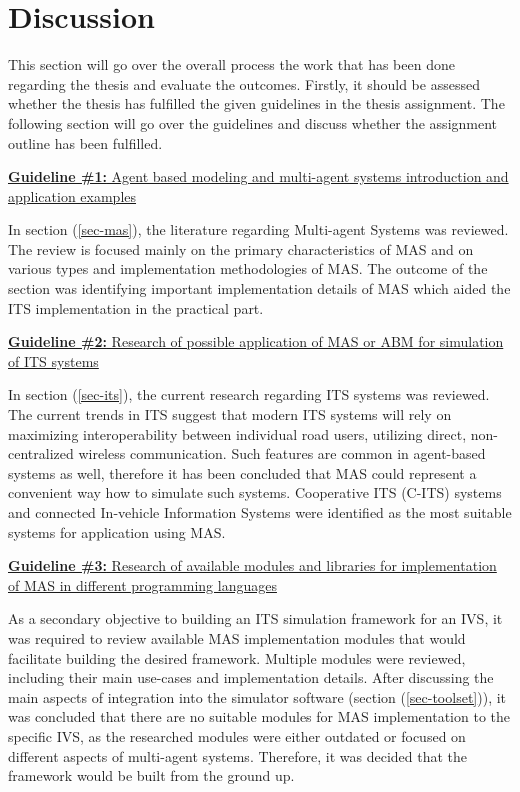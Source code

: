 \documentclass[main.tex]{subfiles}
\begin{document}
\section{Discussion}

This section will go over the overall process the work that has been done regarding the thesis and evaluate the outcomes.
Firstly, it should be assessed whether the thesis has fulfilled the given guidelines in the thesis assignment. The following 
section will go over the guidelines and discuss whether the assignment outline has been fulfilled. 

\ul{\textbf{Guideline \#1:} Agent based modeling and multi-agent systems introduction and application examples}

In section (\ref{sec-mas}), the literature regarding Multi-agent Systems was reviewed. The review is focused mainly on the 
primary characteristics of MAS and on various types and implementation methodologies of MAS. The outcome of the section 
was identifying important implementation details of MAS which aided the ITS implementation in the practical part. 

\ul{\textbf{Guideline \#2:} Research of possible application of MAS or ABM for simulation of ITS systems}

In section (\ref{sec-its}), the current research regarding ITS systems was reviewed. The current trends in ITS suggest that 
modern ITS systems will rely on maximizing interoperability between individual road users, utilizing direct, non-centralized wireless 
communication. Such features are common in agent-based systems as well, therefore it has been concluded that MAS could represent 
a convenient way how to simulate such systems. Cooperative ITS (C-ITS) systems and connected In-vehicle Information Systems were 
identified as the most suitable systems for application using MAS.

\ul{\textbf{Guideline \#3:} Research of available modules and libraries for implementation of MAS in different programming
languages}

As a secondary objective to building an ITS simulation framework for an IVS, it was required to review available MAS implementation 
modules that would facilitate building the desired framework. Multiple modules were reviewed, including their main use-cases 
and implementation details. After discussing the main aspects of integration into the simulator
software (section (\ref{sec-toolset})), it was concluded that there are no suitable modules for MAS implementation to the
specific IVS, as the researched modules were either outdated or focused on different aspects
of multi-agent systems. Therefore, it was decided that the framework would be built from the
ground up.
\end{document}
